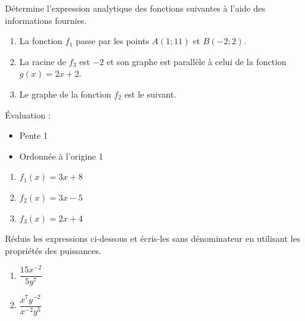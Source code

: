 \documentclass[../partie1.tex]{subfiles}
\begin{document}
\begin{exercise}[points=6]
    Détermine l'expression analytique des fonctions suivantes à l'aide des informations fournies.
    \begin{enumerate}
        \item La fonction $f_1$ passe par les points $A(1;11)$ et $B(-2;2)$.

        \item La racine de $f_3$ est $-2$ et son graphe est parallèle à celui de la fonction $g(x) = 2x + 2$.
        \item Le graphe de la fonction $f_2$ est le suivant. \hfil
    \end{enumerate}
\end{exercise}
\begin{solution}
    Évaluation :
    \begin{itemize}
        \item Pente \hfill 1
        \item Ordonnée à l'origine \hfill 1
    \end{itemize}
    \begin{enumerate}[cols=3]
        \item $f_1(x) = 3x + 8$
        \item $f_2(x) = 3x - 5$
        \item $f_3(x) = 2x + 4$
    \end{enumerate}
\end{solution}
\begin{exercise}[points=1]
    Réduis les expressions ci-dessous  et écris-les sans dénominateur en utilisant les propriétés des puissances.
    \begin{enumerate}[cols=2]
        \item $\dfrac{15x^{-2}}{5y^7}$
        \item $\dfrac{x^7 y^{-2}}{x^{-2}y^5}$
    \end{enumerate}
\end{exercise}
\end{document}
